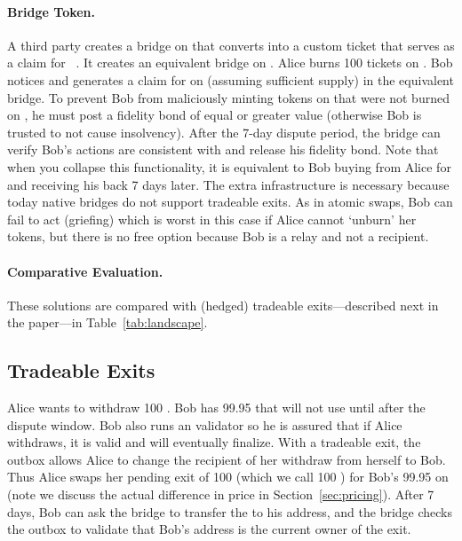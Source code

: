 
\paragraph*{Bridge Token.} A third party creates a bridge on \layertwo that converts \ethtwo into a custom ticket that serves as a claim for \ethtwo~\cite{Whi21}. It creates an equivalent bridge on \layerone. Alice burns 100 tickets on \layertwo. Bob notices and generates a claim for \ethone on \layerone (assuming sufficient supply) in the equivalent \layerone bridge. To prevent Bob from maliciously minting tokens on \layerone that were not burned on \layertwo, he must post a fidelity bond of equal or greater value (otherwise Bob is trusted to not cause insolvency). After the 7-day dispute period, the \layerone bridge can verify Bob's actions are consistent with \layertwo and release his fidelity bond. Note that when you collapse this functionality, it is equivalent to Bob buying \ethxx from Alice for \ethone and receiving his \ethone back 7 days later. The extra infrastructure is necessary because today native bridges do not support tradeable exits. As in atomic swaps, Bob can fail to act (griefing) which is worst in this case if Alice cannot `unburn' her tokens, but there is no free option because Bob is a relay and not a recipient. 

\paragraph*{Comparative Evaluation.} These solutions are compared with (hedged) tradeable exits---described next in the paper---in Table~\ref{tab:landscape}.
 

\subsection{Tradeable Exits} 
\label{sec:tradeablexits}

Alice wants to withdraw 100 \ethtwo. Bob has 99.95 \ethone that will not use until after the dispute window. Bob also runs an \layertwo validator so he is assured that if Alice withdraws, it is valid and will eventually finalize. With a tradeable exit, the outbox allows Alice to change the recipient of her withdraw from herself to Bob. Thus Alice swaps her pending exit of 100 \ethone (which we call 100 \ethxx) for Bob's 99.95 \ethone on \layerone (note we discuss the actual difference in price in Section~\ref{sec:pricing}). After 7 days, Bob can ask the bridge to transfer the \ethone to his address, and the bridge checks the outbox to validate that Bob's address is the current owner of the exit.


